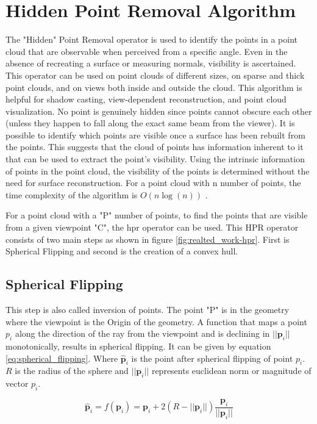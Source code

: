 \section{Hidden Point Removal Algorithm}
The "Hidden" Point Removal operator \parencite{katz2007}is used to identify the points in a point cloud that are observable when perceived from a specific angle. Even in the absence of recreating a surface or measuring normals, visibility is ascertained.  This operator can be used on point clouds of different sizes, on sparse and thick point clouds, and on views both inside and outside the cloud. This algorithm is helpful for shadow casting, view-dependent reconstruction, and point cloud visualization. No point is genuinely hidden since points cannot obscure each other (unless they happen to fall along the exact same beam from the viewer). It is possible to identify which points are visible once a surface has been rebuilt from the points. This suggests that the cloud of points has information inherent to it that can be used to extract the point's visibility. Using the intrinsic information of points in the point cloud, the visibility of the points is determined without the need for surface reconstruction. For a point cloud with n number of points, the time complexity of the algorithm is \(O(n\log(n))\) \parencite{katz2007}.

For a point cloud with a "P" number of points, to find the points that are visible from a given viewpoint "C", the \acrshort{hpr} operator can be used. This HPR operator consists of two main steps as shown in figure \ref{fig:realted_work-hpr}. First is Spherical Flipping and second is the creation of a convex hull. 

\subsection{Spherical Flipping}
This step is also called inversion of points. The point "P" is in the geometry where the viewpoint is the Origin of the geometry. A function that maps a point \(p_i\) along the direction of the ray from the viewpoint and is declining in \(||\mathbf{p}_i||\) monotonically, results in spherical flipping. It can be given by equation \ref{eq:spherical_flipping}. Where \(\hat{\mathbf{p}}_i \) is the point after spherical flipping of point \(p_i\). \(R\) is the radius of the sphere and \(||\mathbf{p}_i||\) represents euclidean norm or magnitude of vector \(p_i\).

\begin{equation}\label{eq:spherical_flipping}
\hat{\mathbf{p}}_i = f(\mathbf{p}_i) = \mathbf{p}_i + 2(R - ||\mathbf{p}_i||) \frac{\mathbf{p}_i}{||\mathbf{p}_i||}
\end{equation}


